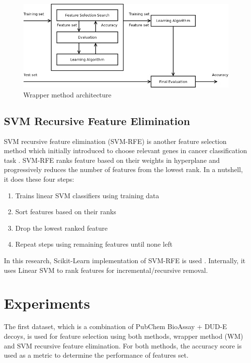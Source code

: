 \documentclass[conference,compsoc,12pt]{IEEEtran}
\begin{document}
	\begin{figure}
		\includegraphics[scale=0.3]{../images/wrapper_method.png}
		\caption{Wrapper method architecture \cite{tang2014feature}}
		\label{fig_wrapper_method_architecture}
	\end{figure}
	
	\subsection{SVM Recursive Feature Elimination}
	
	SVM recursive feature elimination (SVM-RFE) is another feature selection method which initially introduced to choose relevant genes in cancer classification task \cite{guyon2002gene}. SVM-RFE ranks feature based on their weights in hyperplane and progressively reduces the number of features from the lowest rank. In a nutshell, it does these four steps:
	
	\begin{enumerate}
		\item Trains linear SVM classifiers using training data
		\item Sort features based on their ranks
		\item Drop the lowest ranked feature
		\item Repeat steps using remaining features until none left
	\end{enumerate}
		
	In this research, Scikit-Learn implementation of SVM-RFE is used \cite{pedregosa2011scikit}. Internally, it uses Linear SVM to rank features for incremental/recursive removal.
		
	\section{Experiments} \label{Experiments}
	
	The first dataset, which is a combination of PubChem BioAssay + DUD-E decoys, is used for feature selection using both methods, wrapper method (WM) and SVM recursive feature elimination. For both methods, the accuracy score is used as a metric to determine the performance of features set. 
	
\end{document}
